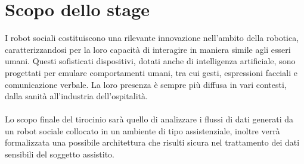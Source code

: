 \section*{Scopo dello stage}
I robot sociali costituiscono una rilevante innovazione nell'ambito della robotica, caratterizzandosi per la loro capacità di interagire in maniera simile agli esseri umani. Questi sofisticati dispositivi, dotati anche di intelligenza artificiale, sono progettati per emulare comportamenti umani, tra cui gesti, espressioni facciali e comunicazione verbale. La loro presenza è sempre più diffusa in vari contesti, dalla sanità all'industria dell'ospitalità. \\\\
Lo scopo finale del tirocinio sarà quello di analizzare i flussi di dati generati da un robot sociale collocato in un ambiente di tipo assistenziale, inoltre verrà formalizzata una possibile architettura che risulti sicura nel trattamento dei dati sensibili del soggetto assistito.\\

